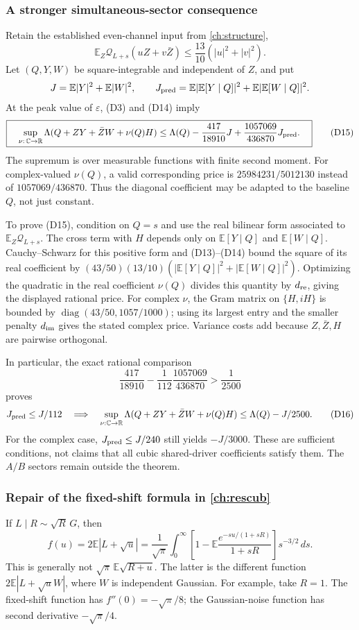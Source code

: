 \subsubsection{A stronger simultaneous-sector consequence}
Retain the established even-channel input from \autoref{ch:structure},
\[
 \mathbb E_Z\mathcal Q_{L+s}(uZ+v\bar Z)
      \le\frac{13}{10}(|u|^2+|v|^2).
 \tag{D14}
\]
Let $(Q,Y,W)$ be square-integrable and independent of $Z$, and put
\[
 J=\mathbb E|Y|^2+\mathbb E|W|^2,\qquad
 J_{\rm pred}=\mathbb E|\mathbb E[Y\mid Q]|^2+
             \mathbb E|\mathbb E[W\mid Q]|^2.
\]
At the peak value of $\varepsilon$, (D3) and (D14) imply
\[
\boxed{\quad
 \sup_{\nu:\,\mathbb C\to\mathbb R}
 \Lambda(Q+ZY+\bar ZW+\nu(Q)H)
 \le\Lambda(Q)-\frac{417}{18910}J
       +\frac{1057069}{436870}J_{\rm pred}.
 \quad}
 \tag{D15}
\]
The supremum is over measurable functions with finite second moment.
For complex-valued $\nu(Q)$, a valid corresponding price is
$25984231/5012130$ instead of $1057069/436870$.
Thus the diagonal coefficient may be adapted to the baseline $Q$,
not just constant.

To prove (D15), condition on $Q=s$ and use the real bilinear form
associated to $\mathbb E_Z\mathcal Q_{L+s}$.
The cross term with $H$ depends only on
$\mathbb E[Y\mid Q]$ and $\mathbb E[W\mid Q]$.
Cauchy--Schwarz for this positive form and (D13)--(D14) bound the
square of its real coefficient by
$(43/50)(13/10)(|\mathbb E[Y\mid Q]|^2+
|\mathbb E[W\mid Q]|^2)$.
Optimizing the quadratic in the real coefficient $\nu(Q)$ divides this
quantity by $d_{\rm re}$, giving the displayed rational price.
For complex $\nu$, the Gram matrix on $\{H,iH\}$ is bounded by
$\operatorname{diag}(43/50,1057/1000)$; using its largest entry
and the smaller penalty $d_{\rm im}$ gives the stated complex price.
Variance costs add because $Z,\bar Z,H$ are pairwise orthogonal.

In particular, the exact rational comparison
\[
 \frac{417}{18910}-\frac1{112}\frac{1057069}{436870}>\frac1{2500}
\]
proves
\[
 J_{\rm pred}\le J/112
 \quad\Longrightarrow\quad
 \sup_{\nu:\mathbb C\to\mathbb R}
 \Lambda(Q+ZY+\bar ZW+\nu(Q)H)\le\Lambda(Q)-J/2500.
 \tag{D16}
\]
For the complex case, $J_{\rm pred}\le J/240$ still yields $-J/3000$.
These are sufficient conditions, not claims that all cubic shared-driver
coefficients satisfy them. The $A/B$ sectors remain outside the theorem.

\subsubsection{Repair of the fixed-shift formula in \autoref{ch:rescub}}
If $L\mid R\sim\sqrt R\,G$, then
\[
 f(u)=2\mathbb E|L+\sqrt u|
 =\frac1{\sqrt\pi}\int_0^\infty
 \left[1-\mathbb E\frac{e^{-su/(1+sR)}}{1+sR}\right]s^{-3/2}\,ds.
 \tag{D17}
\]
This is generally not $\sqrt\pi\,\mathbb E\sqrt{R+u}$.
The latter is the different function $2\mathbb E|L+\sqrt uW|$,
where $W$ is independent Gaussian.
For example, take $R=1$. The fixed-shift function has
$f''(0)=-\sqrt\pi/8$; the Gaussian-noise function has
second derivative $-\sqrt\pi/4$.

